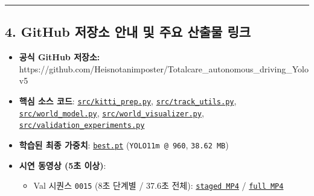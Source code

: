 \documentclass[10.5pt,a4paper]{article}
\begin{document}
\par\noindent\rule{\textwidth}{0.4pt}\par\medskip

\subsection{4. GitHub 저장소 안내 및 주요 산출물 링크}

\begin{itemize}[leftmargin=1.5em,itemsep=2pt]
\item \textbf{공식 GitHub 저장소:} https:\allowbreak{}/\allowbreak{}/\allowbreak{}github.\allowbreak{}com/\allowbreak{}Heisnotanimposter/\allowbreak{}Totalcare\_\allowbreak{}autonomous\_\allowbreak{}driving\_\allowbreak{}Yolov5
\item \textbf{핵심 소스 코드}: \href{https://github.com/Heisnotanimposter/Totalcare\_autonomous\_driving\_Yolov5/blob/main/src/kitti\_prep.py}{\texttt{src/\allowbreak{}kitti\_\allowbreak{}prep.\allowbreak{}py}}, \href{https://github.com/Heisnotanimposter/Totalcare\_autonomous\_driving\_Yolov5/blob/main/src/track\_utils.py}{\texttt{src/\allowbreak{}track\_\allowbreak{}utils.\allowbreak{}py}}, \href{https://github.com/Heisnotanimposter/Totalcare\_autonomous\_driving\_Yolov5/blob/main/src/world\_model.py}{\texttt{src/\allowbreak{}world\_\allowbreak{}model.\allowbreak{}py}}, \href{https://github.com/Heisnotanimposter/Totalcare\_autonomous\_driving\_Yolov5/blob/main/src/world\_visualizer.py}{\texttt{src/\allowbreak{}world\_\allowbreak{}visualizer.\allowbreak{}py}}, \href{https://github.com/Heisnotanimposter/Totalcare\_autonomous\_driving\_Yolov5/blob/main/src/validation\_experiments.py}{\texttt{src/\allowbreak{}validation\_\allowbreak{}experiments.\allowbreak{}py}}
\item \textbf{학습된 최종 가중치}: \href{https://github.com/Heisnotanimposter/Totalcare\_autonomous\_driving\_Yolov5/blob/main/results/v2\_improved/outputs/weights/best.pt}{\texttt{best.\allowbreak{}pt}} (\texttt{YOLO11m @ 960}, \texttt{38.\allowbreak{}62 MB})
\item \textbf{시연 동영상 (5초 이상)}:
\begin{itemize}[leftmargin=1.5em,itemsep=2pt]
\item Val 시퀀스 \texttt{0015} (8초 단계별 / 37.6초 전체): \href{https://github.com/Heisnotanimposter/Totalcare\_autonomous\_driving\_Yolov5/blob/main/results/v3\_bev\_fixed/world\_outputs/world\_model\_0015\_staged/world\_model\_demo\_0015.mp4}{\texttt{staged MP4}} / \href{https://github.com/Heisnotanimposter/Totalcare\_autonomous\_driving\_Yolov5/blob/main/results/v3\_bev\_fixed/world\_outputs/world\_model\_0015\_full/world\_model\_demo\_0015.mp4}{\texttt{full MP4}}

\end{itemize}
\end{itemize}
\end{document}
